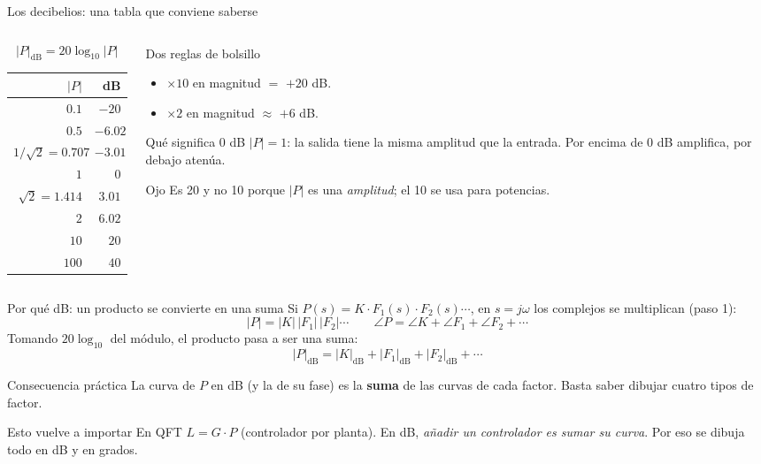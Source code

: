 \documentclass[aspectratio=169,11pt]{beamer}
\begin{document}
\begin{frame}{Los decibelios: una tabla que conviene saberse}
  \small
  \begin{columns}[T]
  \begin{column}{0.48\textwidth}
    \[ |P|_{\text{dB}}=20\log_{10}|P| \]
    \centering
    \begin{tabular}{r|r}
      $|P|$ & dB\\ \hline
      $0.1$ & $-20$\\
      $0.5$ & $-6.02$\\
      $1/\sqrt2=0.707$ & $-3.01$\\
      $1$ & $0$\\
      $\sqrt2=1.414$ & $3.01$\\
      $2$ & $6.02$\\
      $10$ & $20$\\
      $100$ & $40$
    \end{tabular}
  \end{column}
  \begin{column}{0.5\textwidth}
    \begin{block}{Dos reglas de bolsillo}
      \begin{itemize}
        \item $\times10$ en magnitud $=$ $+20$ dB.
        \item $\times2$ en magnitud $\approx$ $+6$ dB.
      \end{itemize}
    \end{block}
    \begin{block}{Qué significa 0 dB}
      $|P|=1$: la salida tiene la misma amplitud que la entrada. Por encima de 0 dB amplifica, por debajo atenúa.
    \end{block}
    \begin{alertblock}{Ojo}
      Es 20 y no 10 porque $|P|$ es una \emph{amplitud}; el 10 se usa para potencias.
    \end{alertblock}
  \end{column}
  \end{columns}
\end{frame}

\begin{frame}{Por qué dB: un producto se convierte en una suma}
  \small
  Si $P(s)=K\cdot F_1(s)\cdot F_2(s)\cdots$, en $s=j\omega$ los complejos se multiplican (paso 1):
  \[ |P|=|K|\,|F_1|\,|F_2|\cdots \qquad \angle P=\angle K+\angle F_1+\angle F_2+\cdots \]
  Tomando $20\log_{10}$ del módulo, el producto pasa a ser una suma:
  \[ \boxed{\;|P|_{\text{dB}}=|K|_{\text{dB}}+|F_1|_{\text{dB}}+|F_2|_{\text{dB}}+\cdots\;} \]
  \begin{block}{Consecuencia práctica}
    La curva de $P$ en dB (y la de su fase) es la \textbf{suma} de las curvas de cada factor. Basta saber dibujar cuatro tipos de factor.
  \end{block}
  \begin{alertblock}{Esto vuelve a importar}
    En QFT $L=G\cdot P$ (controlador por planta). En dB, \emph{añadir un controlador es sumar su curva}. Por eso se dibuja todo en dB y en grados.
  \end{alertblock}
\end{frame}
\end{document}
